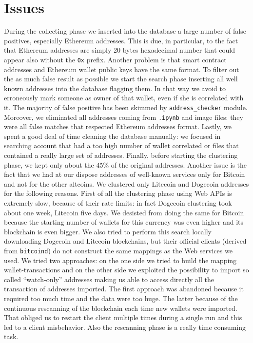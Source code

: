 \section{Issues} \label{sec:issues}
During the collecting phase we inserted into the database a large number of
false positives, especially Ethereum addresses. This is due, in particular, to
the fact that Ethereum addresses are simply 20 bytes hexadecimal number that
could appear also without the \texttt{0x} prefix. Another problem is that smart
contract addresses and Ethereum wallet public keys have the same format. To
filter out the as much false result as possible we start the search phase
inserting all well known addresses into the database flagging them. In that way
we avoid to erroneously mark someone as owner of that wallet, even if she is
correlated with it. The majority of false positive has been skimmed by
\texttt{address\_checker} module. Moreover, we eliminated all addresses coming
from \texttt{.ipynb} and image files: they were all false matches that
respected Ethereum addresses format. Lastly, we spent a good deal of time
cleaning the database manually: we focused in searching account that had a too
high number of wallet correlated or files that contained a really large set of
addresses. Finally, before starting the clustering phase, we kept only about
the 45\% of the original addresses.
Another issue is the fact that we had at our dispose addresses
of well-known services only for Bitcoin and not for the other altcoins.
We clustered only Litecoin and Dogecoin addresses for the following reasons.
First of all the clustering phase using Web APIs is extremely slow, because of
their rate limits: in fact Dogecoin clustering took about one week, Litecoin
five days.
We desisted from doing the same for Bitcoin because the starting number of
wallets for this currency was even higher and its blockchain is even bigger. We
also tried to perform this search locally downloading Dogecoin and Litecoin
blockchains, but their official clients (derived from \texttt{bitcoind}) do not
construct the same mappings as the Web services we used. We tried two
approaches: on the one side we tried to build the mapping wallet-transactions
and on the other side we exploited the possibility to import so called
``watch-only'' addresses making us able to access directly all the transaction
of addresses imported. The first approach was abandoned because it
required too much time and the data were too huge. The latter because of the
continuous rescanning of the blockchain each time new wallets were imported.
That obliged us to restart the client multiple times during a single run and
this led to a client misbehavior. Also the rescanning phase is a really
time consuming task.
